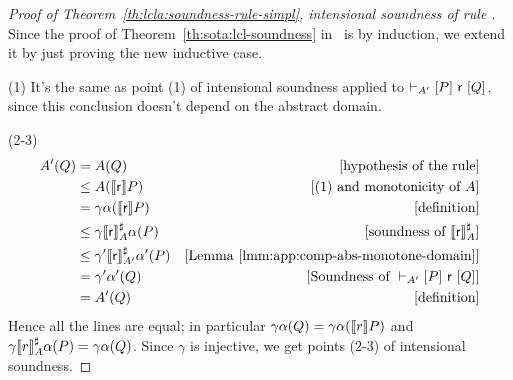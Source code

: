 \begin{proof}[Proof of Theorem~\ref{th:lcla:soundness-rule-simpl}, intensional soundness of rule ]
	Since the proof of Theorem~\ref{th:sota:lcl-soundness} in~\cite{BGGR21} is by induction, we extend it by just proving the new inductive case.
	
	(1) It's the same as point (1) of intensional soundness applied to $\vdash_{A'}\nobreak[P]~\mathsf{r}~[Q]$, since this conclusion doesn't depend on the abstract domain.
	
	\noindent (2-3)
	\begin{align*}
		A'(Q) &= A(Q) &[\text{hypothesis of the rule}] \\
		&\le A(\llbracket\mathsf{r}\rrbracket P) &[\text{(1) and monotonicity of }A] \\
		&= \gamma \alpha(\llbracket\mathsf{r}\rrbracket P) &[\text{definition}] \\
		&\le \gamma \llbracket\mathsf{r}\rrbracket^{\sharp}_{A} \alpha(P) &[\text{soundness of } \llbracket\mathsf{r}\rrbracket^{\sharp}_{A}] \\
		&\le \gamma' \llbracket\mathsf{r}\rrbracket^{\sharp}_{A'} \alpha'(P) &[\text{Lemma~\ref{lmm:app:comp-abs-monotone-domain}}] \\
		&= \gamma' \alpha'(Q) &[\text{Soundness of }\vdash_{A'}\nobreak[P]~\mathsf{r}~[Q]] \\
		&= A'(Q) &[\text{definition}]
	\end{align*}
	Hence all the lines are equal; in particular $\gamma \alpha(Q) = \gamma \alpha(\llbracket r\rrbracket P)$ and $\gamma \llbracket r\rrbracket^{\sharp}_{A} \alpha(P) = \gamma \alpha(Q)$. Since $\gamma$ is injective, we get points (2-3) of intensional soundness.
\end{proof}

